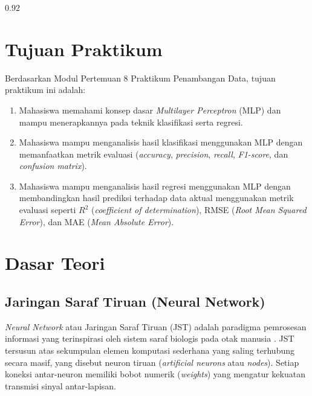 \documentclass[a4paper,oneside,12pt]{report}
\begin{document}
\begin{spacing}{0.92}
	\tableofcontents
\end{spacing}
\clearpage

\setcounter{page}{3}

\chapter[Tujuan Praktikum]{Tujuan Praktikum}
Berdasarkan Modul Pertemuan 8 Praktikum Penambangan Data, tujuan praktikum ini adalah:
\begin{enumerate}[noitemsep, topsep=4pt, parsep=2pt]
	\item Mahasiswa memahami konsep dasar \textit{Multilayer Perceptron} (MLP) dan mampu menerapkannya pada teknik klasifikasi serta regresi.
	\item Mahasiswa mampu menganalisis hasil klasifikasi menggunakan MLP dengan memanfaatkan metrik evaluasi (\textit{accuracy}, \textit{precision}, \textit{recall}, \textit{F1-score}, dan \textit{confusion matrix}).
	\item Mahasiswa mampu menganalisis hasil regresi menggunakan MLP dengan membandingkan hasil prediksi terhadap data aktual menggunakan metrik evaluasi seperti $R^2$ (\textit{coefficient of determination}), RMSE (\textit{Root Mean Squared Error}), dan MAE (\textit{Mean Absolute Error}).
\end{enumerate}

\clearpage

\chapter{Dasar Teori}

\section{Jaringan Saraf Tiruan (Neural Network)}
\textit{Neural Network} atau Jaringan Saraf Tiruan (JST) adalah paradigma pemrosesan informasi yang terinspirasi oleh sistem saraf biologis pada otak manusia \cite{haykin2009}. JST tersusun atas sekumpulan elemen komputasi sederhana yang saling terhubung secara masif, yang disebut neuron tiruan (\textit{artificial neurons} atau \textit{nodes}). Setiap koneksi antar-neuron memiliki bobot numerik (\textit{weights}) yang mengatur kekuatan transmisi sinyal antar-lapisan.
\end{document}
